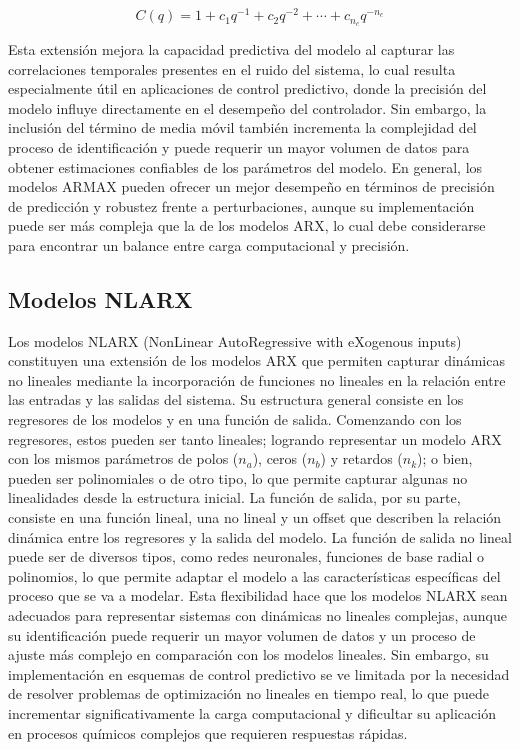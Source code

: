 \begin{equation}
C(q) = 1 + c_1 q^{-1} + c_2 q^{-2} + \cdots + c_{n_c} q^{-n_c}
\label{eq:armax_C}
\end{equation}

Esta extensión mejora la capacidad predictiva del modelo al capturar las correlaciones temporales presentes en el ruido del sistema, lo cual resulta especialmente útil en aplicaciones de control predictivo, donde la precisión del modelo influye directamente en el desempeño del controlador. Sin embargo, la inclusión del término de media móvil también incrementa la complejidad del proceso de identificación y puede requerir un mayor volumen de datos para obtener estimaciones confiables de los parámetros del modelo. En general, los modelos ARMAX pueden ofrecer un mejor desempeño en términos de precisión de predicción y robustez frente a perturbaciones, aunque su implementación puede ser más compleja que la de los modelos ARX, lo cual debe considerarse para encontrar un balance entre carga computacional y precisión.

\subsection{Modelos NLARX}
Los modelos NLARX (NonLinear AutoRegressive with eXogenous inputs) constituyen una extensión de los modelos ARX que permiten capturar dinámicas no lineales mediante la incorporación de funciones no lineales en la relación entre las entradas y las salidas del sistema. Su estructura general consiste en los regresores de los modelos y en una función de salida. Comenzando con los regresores, estos pueden ser tanto lineales; logrando representar un modelo ARX con los mismos parámetros de polos ($n_a$), ceros ($n_b$) y retardos ($n_k$); o bien, pueden ser polinomiales o de otro tipo, lo que permite capturar algunas no linealidades desde la estructura inicial. La función de salida, por su parte, consiste en una función lineal, una no lineal y un offset que describen la relación dinámica entre los regresores y la salida del modelo. La función de salida no lineal puede ser de diversos tipos, como redes neuronales, funciones de base radial o polinomios, lo que permite adaptar el modelo a las características específicas del proceso que se va a modelar. Esta flexibilidad hace que los modelos NLARX sean adecuados para representar sistemas con dinámicas no lineales complejas, aunque su identificación puede requerir un mayor volumen de datos y un proceso de ajuste más complejo en comparación con los modelos lineales. Sin embargo, su implementación en esquemas de control predictivo se ve limitada por la necesidad de resolver problemas de optimización no lineales en tiempo real, lo que puede incrementar significativamente la carga computacional y dificultar su aplicación en procesos químicos complejos que requieren respuestas rápidas.
